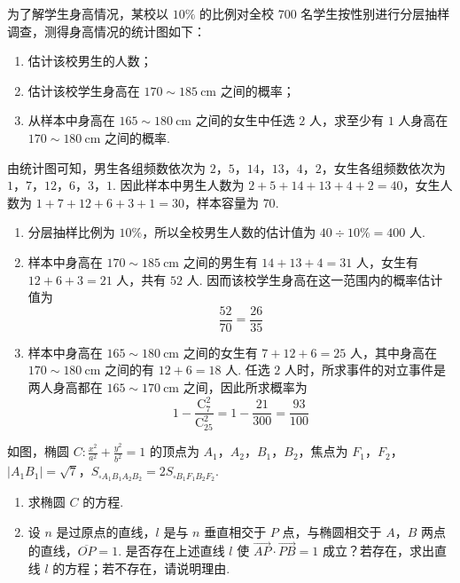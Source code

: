 \begin{problem}
为了解学生身高情况，某校以 \(10\%\) 的比例对全校 \(700\) 名学生按性别进行分层抽样调查，测得身高情况的统计图如下：

\begin{enumerate}
\item 估计该校男生的人数；
\item 估计该校学生身高在 \(170 \sim 185 \mathrm{~cm}\) 之间的概率；
\item 从样本中身高在 \(165 \sim 180 \mathrm{~cm}\) 之间的女生中任选 \(2\) 人，求至少有 \(1\) 人身高在 \(170 \sim 180 \mathrm{~cm}\) 之间的概率.
\end{enumerate}

\end{problem}

\begin{solution}
由统计图可知，男生各组频数依次为 \(2\)，\(5\)，\(14\)，\(13\)，\(4\)，\(2\)，女生各组频数依次为 \(1\)，\(7\)，\(12\)，\(6\)，\(3\)，\(1\). 因此样本中男生人数为 \(2+5+14+13+4+2=40\)，女生人数为 \(1+7+12+6+3+1=30\)，样本容量为 \(70\).
\begin{enumerate}
\item 分层抽样比例为 \(10\%\)，所以全校男生人数的估计值为 \(40\div 10\%=400\) 人.
\item 样本中身高在 \(170\sim185\mathrm{~cm}\) 之间的男生有 \(14+13+4=31\) 人，女生有 \(12+6+3=21\) 人，共有 \(52\) 人. 因而该校学生身高在这一范围内的概率估计值为
\[
\frac{52}{70}=\frac{26}{35}
\]
\item 样本中身高在 \(165\sim180\mathrm{~cm}\) 之间的女生有 \(7+12+6=25\) 人，其中身高在 \(170\sim180\mathrm{~cm}\) 之间的有 \(12+6=18\) 人. 任选 \(2\) 人时，所求事件的对立事件是两人身高都在 \(165\sim170\mathrm{~cm}\) 之间，因此所求概率为
\[
1-\frac{\mathrm C_{7}^{2}}{\mathrm C_{25}^{2}}=1-\frac{21}{300}=\frac{93}{100}
\]
\end{enumerate}
\end{solution}

\begin{problem}
如图，椭圆 \(C: \frac{x^2}{a^2} + \frac{y^2}{b^2} = 1\) 的顶点为 \(A_1\)，\(A_2\)，\(B_1\)，\(B_2\)，焦点为 \(F_1\)，\(F_2\)，\(|A_1B_1| = \sqrt{7}\)，\(S_{\square A_1B_1A_2B_2} = 2S_{\square B_1F_1B_2F_2}\).
\begin{enumerate}
\item 求椭圆 \(C\) 的方程.
\item 设 \(n\) 是过原点的直线，\(l\) 是与 \(n\) 垂直相交于 \(P\) 点，与椭圆相交于 \(A\)，\(B\) 两点的直线，\(\overline{OP}=1\). 是否存在上述直线 \(l\) 使 \(\overrightarrow{AP}\cdot\overrightarrow{PB}=1\) 成立？若存在，求出直线 \(l\) 的方程；若不存在，请说明理由.
\end{enumerate}

\end{problem}

